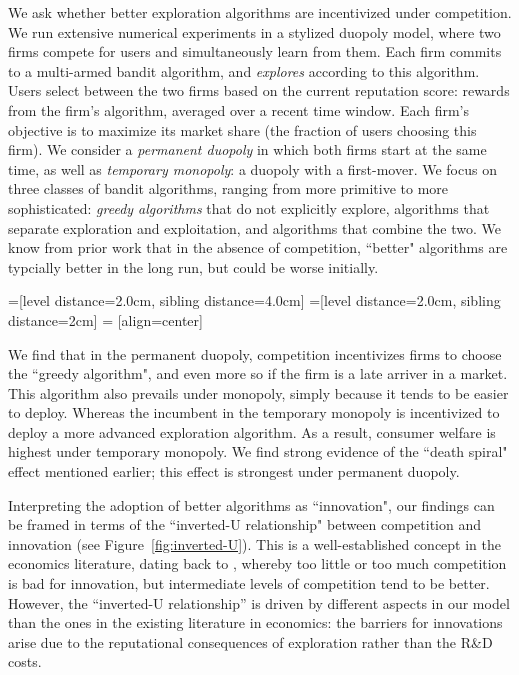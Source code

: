 \documentclass[acmsmall]{ec19acm}
\theoremstyle{definition}
\newcommand{\xhdr}[1]{\vspace{1mm} \noindent{\bf #1}}
\begin{document}
We ask whether better exploration algorithms are incentivized under competition.  We run extensive numerical experiments in a stylized duopoly model, where two firms compete for users and simultaneously learn from them. Each firm commits to a multi-armed bandit algorithm, and \emph{explores} according to this algorithm. Users select between the two firms based on the current reputation score: rewards from the firm's algorithm, averaged over a recent time window. Each firm's objective is to maximize its market share (the fraction of users choosing this firm). We consider a \emph{permanent duopoly} in which both firms start at the same time, as well as \emph{temporary monopoly}: a duopoly with a first-mover. We focus on three classes of bandit algorithms, ranging from more primitive to more sophisticated: \emph{greedy algorithms} that do not explicitly explore, algorithms that separate exploration and exploitation, and algorithms that combine the two. We know from prior work that in the absence of competition,  ``better" algorithms are typcially better in the long run, but could be worse initially.


=[level distance=2.0cm, sibling distance=4.0cm]
=[level distance=2.0cm, sibling distance=2cm]
 = [align=center]

\xhdr{Main findings.}
We find that in the permanent duopoly, competition incentivizes firms to choose the ``greedy algorithm", and even more so if the firm is a late arriver in a market. This algorithm also prevails under monopoly, simply because it tends to be easier to deploy. Whereas the incumbent in the temporary monopoly is incentivized to deploy a more advanced exploration algorithm. As a result, consumer welfare is highest under temporary monopoly. We find strong evidence of the ``death spiral" effect mentioned earlier; this effect is strongest under permanent duopoly.

Interpreting the adoption of better algorithms as ``innovation", our findings can be framed in terms of the ``inverted-U relationship" between competition and innovation (see Figure~\ref{fig:inverted-U}). This is a well-established concept in the economics literature, dating back to \cite{Schumpeter-42}, whereby too little or too much competition is bad for innovation, but intermediate levels of competition tend to be better. However, the ``inverted-U relationship'' is driven by different aspects in our model than the ones in the existing literature in economics:  the barriers for innovations arise due to the reputational consequences of exploration rather than the R\&D costs.
\end{document}
